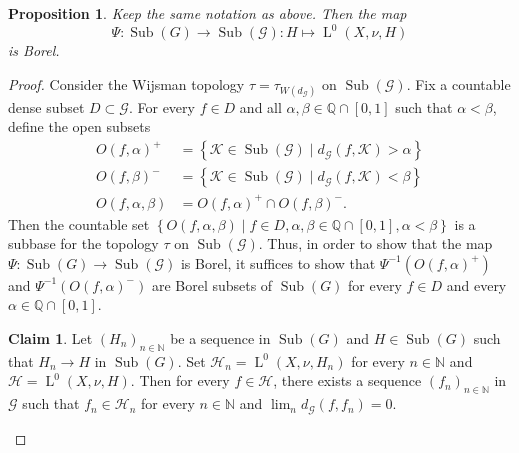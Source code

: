 \documentclass[11pt]{amsart}
\numberwithin{equation}{section}
\theoremstyle{plain}
\newtheorem{prop}[thm]{Proposition}
\theoremstyle{definition}
\newtheorem{claim}[thm]{Claim}
\newcommand{\N}{\mathbb{N}}
\newcommand{\Sub}{\operatorname{Sub}}
\newcommand{\rL}{\operatorname{L}}
\begin{document}
\begin{prop}\label{prop-borel}
Keep the same notation as above. Then the map 
$$\Psi : \Sub(G) \to \Sub(\mathscr G) : H \mapsto \rL^0(X, \nu, H)$$ 
is Borel.
\end{prop}

\begin{proof}
Consider the Wijsman topology $\tau = \tau_{W(d_{\mathscr G})}$ on $\Sub(\mathscr G)$. Fix a countable dense subset $D \subset \mathscr G$. For every $f \in D$ and all $\alpha, \beta \in \mathbb Q \cap [0, 1]$ such that $\alpha < \beta$, define the open subsets 
\begin{align*}
O(f, \alpha)^+ &= \left \{\mathscr K \in \Sub(\mathscr G) \mid d_{\mathscr G}(f, \mathscr K) > \alpha \right \} \\
O(f, \beta)^- &= \left \{\mathscr K \in \Sub(\mathscr G) \mid d_{\mathscr G}(f, \mathscr K) < \beta \right \} \\
O(f, \alpha, \beta) &= O(f, \alpha)^+ \cap O(f, \beta)^-.
\end{align*}
Then the countable set $\left \{ O(f, \alpha, \beta) \mid f \in D, \alpha, \beta \in \mathbb Q \cap [0, 1],\alpha < \beta \right \}$ is a subbase for the topology $\tau$ on $\Sub(\mathscr G)$. Thus, in order to show that the map $\Psi : \Sub(G) \to \Sub(\mathscr G)$ is Borel, it suffices to show that $\Psi^{-1}(O(f, \alpha)^+)$ and $\Psi^{-1}(O(f, \alpha)^-)$ are Borel subsets of $\Sub(G)$ for every $f \in D$ and every $\alpha \in \mathbb Q \cap [0, 1]$.


\begin{claim}\label{claim-lusin}
Let $(H_n)_{n \in \N}$ be a sequence in $\Sub(G)$ and $H \in \Sub(G)$ such that $H_n \to H$ in $\Sub(G)$. Set $\mathscr H_n = \rL^0(X, \nu, H_n)$ for every $n \in \N$ and $\mathscr H = \rL^0(X, \nu, H)$. Then for every $f \in \mathscr H$, there exists a sequence $(f_n)_{n \in \N}$ in $\mathscr G$ such that $f_n \in \mathscr H_n$ for every $n \in \N$ and $\lim_n d_{\mathscr G}(f, f_n) = 0$.
\end{claim}


\end{proof}
\end{document}
